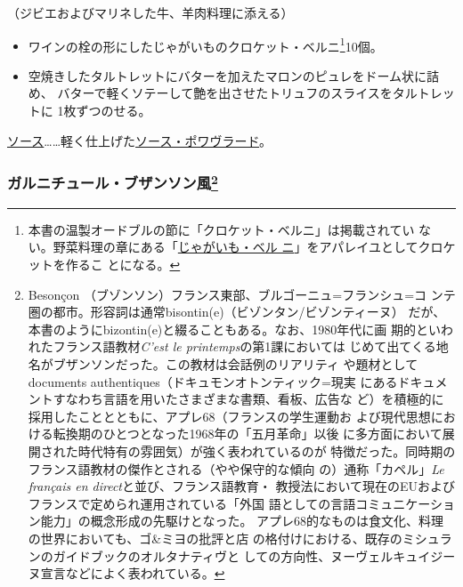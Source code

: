 \begin{recette}


（ジビエおよびマリネした牛、羊肉料理に添える）

\begin{itemize}
\item
  ワインの栓の形にしたじゃがいものクロケット・ベルニ\footnote{本書の温製オードブルの節に「クロケット・ベルニ」は掲載されてい
    ない。野菜料理の章にある「\protect\hyperlink{pommes-de-terre-berny}{じゃがいも・ベル
    ニ}」をアパレイユとしてクロケットを作るこ とになる。}10個。
\item
  空焼きしたタルトレットにバターを加えたマロンのピュレをドーム状に詰め、
  バターで軽くソテーして艶を出させたトリュフのスライスをタルトレットに
  1枚ずつのせる。
\end{itemize}

\ul{ソース}\ldots{}\ldots{}軽く仕上げた\protect\hyperlink{sauce-poivrade}{ソース・ポワヴラード}。

\hypertarget{garniture-bezontinne}{%
\subsubsection[ガルニチュール・ブザンソン風]{\texorpdfstring{ガルニチュール・ブザンソン風\footnote{Besonçon
  （ブゾンソン）フランス東部、ブルゴーニュ=フランシュ=コ
  ンテ圏の都市。形容詞は通常bisontin(e)（ビゾンタン/ビゾンティーヌ）
  だが、本書のようにbizontin(e)と綴ることもある。なお、1980年代に画
  期的といわれたフランス語教材\emph{C'est le printemps}の第1課においては
  じめて出てくる地名がブザンソンだった。この教材は会話例のリアリティ
  や題材としてdocuments authentiques（ドキュモンオトンティック=現実
  にあるドキュメントすなわち言語を用いたさまざまな書類、看板、広告な
  ど）を積極的に採用したこととともに、アプレ68（フランスの学生運動お
  よび現代思想における転換期のひとつとなった1968年の「五月革命」以後
  に多方面において展開された時代特有の雰囲気）が強く表われているのが
  特徴だった。同時期のフランス語教材の傑作とされる（やや保守的な傾向
  の）通称「カペル」\emph{Le français en direct}と並び、フランス語教育・
  教授法において現在のEUおよびフランスで定められ運用されている「外国
  語としての言語コミュニケーション能力」の概念形成の先駆けとなった。
  アプレ68的なものは食文化、料理の世界においても、ゴ\&ミヨの批評と店
  の格付けにおける、既存のミシュランのガイドブックのオルタナティヴと
  しての方向性、ヌーヴェルキュイジーヌ宣言などによく表われている。}}{ガルニチュール・ブザンソン風}}\label{garniture-bezontinne}}


\end{recette}
